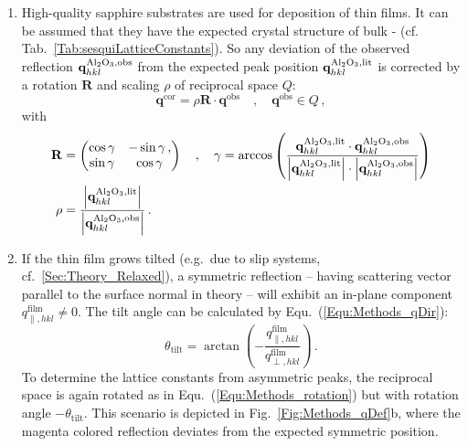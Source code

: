 \begin{enumerate}
    \item High-quality sapphire substrates are used for deposition of thin films.
    It can be assumed that they have the expected crystal structure of bulk \textalpha- (cf. Tab.~\ref{Tab:sesquiLatticeConstants}).
    So any deviation of the observed reflection $\mathbf{q}_{hkl}^\mathrm{\ce{Al2O3},obs}$ from the expected peak position $\mathbf{q}_{hkl}^\mathrm{\ce{Al2O3},lit}$ is corrected by a rotation $\mathbf{R}$ and scaling $\rho$ of reciprocal space $Q$:
    \begin{equation}
        \mathbf{q}^\mathrm{cor}=\rho\mathbf{R}\cdot\mathbf{q}^\mathrm{obs}\quad,\quad\mathbf{q}^\mathrm{obs}\in Q\,,
    \end{equation}
    with
    \begin{align}
        \label{Equ:Methods_rotation}
        \mathbf{R}&=\begin{pmatrix}
            \cos\gamma&-\sin\gamma\,,\\
            \sin\gamma&\cos\gamma
        \end{pmatrix}\quad,\quad
        \gamma=\arccos\left(
            \frac
                {\mathbf{q}_{hkl}^\mathrm{\ce{Al2O3},lit}
                    \cdot\mathbf{q}_{hkl}^\mathrm{\ce{Al2O3},obs}}
                {\left|\mathbf{q}_{hkl}^\mathrm{\ce{Al2O3},lit}\right|
                    \cdot\left|\mathbf{q}_{hkl}^\mathrm{\ce{Al2O3},obs}\right|}
            \right)\\
        \rho&=\frac{\left|\mathbf{q}_{hkl}^\mathrm{\ce{Al2O3},lit}\right|}{\left|\mathbf{q}_{hkl}^\mathrm{\ce{Al2O3},obs}\right|}\,.
    \end{align}

    \item If the thin film grows tilted (e.g.\ due to slip systems, cf.~\ref{Sec:Theory_Relaxed}), a symmetric reflection -- having scattering vector parallel to the surface normal in theory -- will exhibit an in-plane component $q_{\parallel,hkl}^\mathrm{film}\neq0$.
    The tilt angle can be calculated by Equ.~(\ref{Equ:Methods_qDir}): 
    \begin{equation}
        \theta_\mathrm{tilt}=\arctan\left(-\frac{q_{\parallel,hkl}^\mathrm{film}}{q_{\perp,hkl}^\mathrm{film}}\right)\,.
    \end{equation}
    To determine the lattice constants from asymmetric peaks, the reciprocal space is again rotated as in Equ.~(\ref{Equ:Methods_rotation}) but with rotation angle $-\theta_\mathrm{tilt}$.
    This scenario is depicted in Fig.~\ref{Fig:Methods_qDef}b, where the magenta colored reflection deviates from the expected symmetric position.


\end{enumerate}
